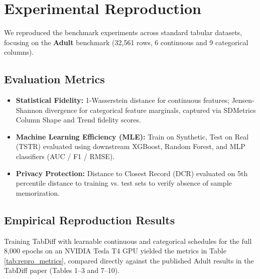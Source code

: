 \documentclass[11pt,a4paper]{article}
\begin{document}
\section{Experimental Reproduction}
We reproduced the benchmark experiments across standard tabular datasets, focusing on the \textbf{Adult} benchmark (32,561 rows, 6 continuous and 9 categorical columns).

\subsection{Evaluation Metrics}
\begin{itemize}
    \item \textbf{Statistical Fidelity:} 1-Wasserstein distance for continuous features; Jensen-Shannon divergence for categorical feature marginals, captured via SDMetrics Column Shape and Trend fidelity scores.
    \item \textbf{Machine Learning Efficiency (MLE):} Train on Synthetic, Test on Real (TSTR) evaluated using downstream XGBoost, Random Forest, and MLP classifiers (AUC / F1 / RMSE).
    \item \textbf{Privacy Protection:} Distance to Closest Record (DCR) evaluated on 5th percentile distance to training vs. test sets to verify absence of sample memorization.
\end{itemize}

\subsection{Empirical Reproduction Results}
Training TabDiff with learnable continuous and categorical schedules for the full 8,000 epochs on an NVIDIA Tesla T4 GPU yielded the metrics in Table \ref{tab:repro_metrics}, compared directly against the published Adult results in the TabDiff paper (Tables 1--3 and 7--10).
\end{document}
